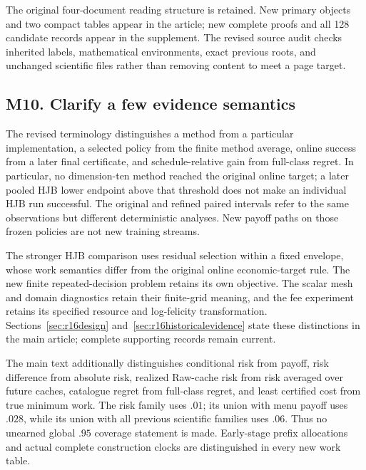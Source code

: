 The original four-document reading structure is retained. New primary objects and two compact tables appear in the article; new complete proofs and all 128 candidate records appear in the supplement. The revised source audit checks inherited labels, mathematical environments, exact previous roots, and unchanged scientific files rather than removing content to meet a page target.

\subsection*{M10. Clarify a few evidence semantics}\label{resp:M10}
The revised terminology distinguishes a method from a particular implementation, a selected policy from the finite method average, online success from a later final certificate, and schedule-relative gain from full-class regret. In particular, no dimension-ten method reached the original online target; a later pooled HJB lower endpoint above that threshold does not make an individual HJB run successful. The original and refined paired intervals refer to the same observations but different deterministic analyses. New payoff paths on those frozen policies are not new training streams.

The stronger HJB comparison uses residual selection within a fixed envelope, whose work semantics differ from the original online economic-target rule. The new finite repeated-decision problem retains its own objective. The scalar mesh and domain diagnostics retain their finite-grid meaning, and the fee experiment retains its specified resource and log-felicity transformation. Sections~\ref{sec:r16design} and~\ref{sec:r16historicalevidence} state these distinctions in the main article; complete supporting records remain current.


The main text additionally distinguishes conditional risk from payoff, risk difference from absolute risk, realized Raw-cache risk from risk averaged over future caches, catalogue regret from full-class regret, and least certified cost from true minimum work. The risk family uses $.01$; its union with menu payoff uses $.028$, while its union with all previous scientific families uses $.06$. Thus no unearned global $.95$ coverage statement is made. Early-stage prefix allocations and actual complete construction clocks are distinguished in every new work table.
